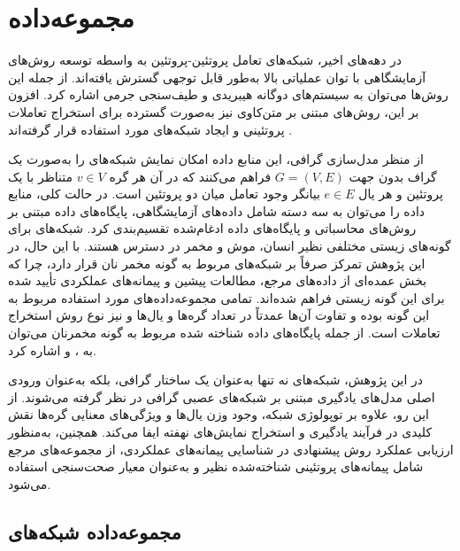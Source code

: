 \section{مجموعه‌داده}
 
 در دهه‌های اخیر، شبکه‌های تعامل پروتئین-پروتئین به‌ واسطه توسعه روش‌های آزمایشگاهی با توان عملیاتی بالا به‌طور قابل توجهی گسترش یافته‌اند. از جمله این روش‌ها می‌توان به سیستم‌های دوگانه هیبریدی \cite{2015clusteringsurvey} و طیف‌سنجی جرمی \cite{2018community} اشاره کرد. افزون بر این، روش‌های مبتنی بر متن‌کاوی نیز به‌صورت گسترده برای استخراج تعاملات پروتئینی و ایجاد شبکه‌های  مورد استفاده قرار گرفته‌اند \cite{2019analysis}.
 
 از منظر مدل‌سازی گرافی، این منابع داده امکان نمایش شبکه‌های  را به‌صورت یک گراف بدون جهت $G=(V,E)$ فراهم می‌کنند که در آن هر گره $v \in V$ متناظر با یک پروتئین و هر یال $e \in E$ بیانگر وجود تعامل میان دو پروتئین است. در حالت کلی، منابع داده  را می‌توان به سه دسته شامل داده‌های آزمایشگاهی، پایگاه‌های داده مبتنی بر روش‌های محاسباتی و پایگاه‌های داده ادغام‌شده تقسیم‌بندی کرد.  شبکه‌های  برای گونه‌های زیستی مختلفی نظیر انسان، موش و مخمر در دسترس هستند. با این حال، در این پژوهش تمرکز صرفاً بر شبکه‌های مربوط به گونه مخمر نان قرار دارد، چرا که بخش عمده‌ای از داده‌های مرجع، مطالعات پیشین و پیمانه‌های عملکردی تأیید شده برای این گونه زیستی فراهم شده‌اند. تمامی مجموعه‌داده‌های مورد استفاده مربوط به این گونه بوده و تفاوت آن‌ها عمدتاً در تعداد گره‌ها و یال‌ها و نیز نوع روش استخراج تعاملات است. از جمله پایگاه‌های داده شناخته‌ شده مربوط به گونه مخمر‌نان می‌توان به  \cite{2006biogrid}،  \cite{2002dip} و  \cite{collins2007} اشاره کرد.
 
 در این پژوهش، شبکه‌های  نه ‌تنها به‌عنوان یک ساختار گرافی، بلکه به‌عنوان ورودی اصلی مدل‌های یادگیری مبتنی بر شبکه‌های عصبی گرافی در نظر گرفته می‌شوند. از این رو، علاوه بر توپولوژی شبکه، وجود وزن یال‌ها و ویژگی‌های معنایی گره‌ها نقش کلیدی در فرآیند یادگیری و استخراج نمایش‌های نهفته ایفا می‌کند. همچنین، به‌منظور ارزیابی عملکرد روش پیشنهادی در شناسایی پیمانه‌های عملکردی، از مجموعه‌های مرجع شامل پیمانه‌های پروتئینی شناخته‌شده نظیر \cite{cyc2008} و  \cite{2005mips} به‌عنوان معیار صحت‌سنجی استفاده می‌شود.
 
 \subsection{مجموعه‌‌داده شبکه‌های }
 
